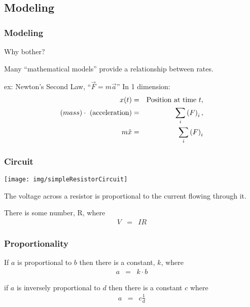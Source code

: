 \subsection{Modeling}


\begin{frame}
  \frametitle{Modeling}

  Why bother?

  Many ``mathematical models'' provide a relationship between rates.

  ex: Newton's Second Law, ``$\vec{F} = m \vec{a}$'' In 1 dimension:
  \begin{eqnarray*}
    x(t) & = & \mathrm{Position~at~time~}t, \\
    \mathrm(mass)\cdot\mathrm{~(acceleration)} & = & \sum_i \left( F \right)_i, \\
    m \ddot{x} & = & \sum_i \left( F \right)_i
  \end{eqnarray*}

  
\end{frame}


\begin{frame}
  \frametitle{Circuit}
 
  \centerline{\texttt{[image: img/simpleResistorCircuit]}}
 
  The voltage across a resistor is proportional to the current flowing
  through it.

  {
    There is some number, R, where
    \begin{eqnarray*}
      V & = & IR
    \end{eqnarray*}
  }
\end{frame}

\begin{frame}
  \frametitle{Proportionality}
  
  If $a$ is proportional to $b$ then there is a constant, $k$, where 
  \begin{eqnarray*}
    a  & = & k \cdot b
  \end{eqnarray*}

  if $a$ is inversely proportional to $d$ then there is a constant $c$
  where 
  \begin{eqnarray*}
    a & = & c \frac{1}{d}
  \end{eqnarray*}
\end{frame}

